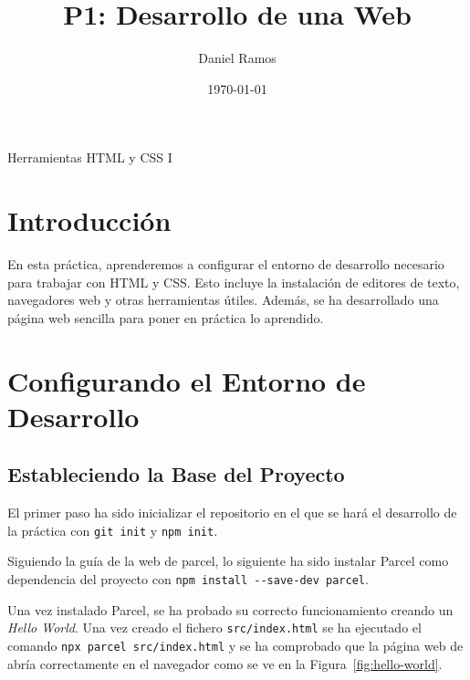 \documentclass{article}
\title{P1: Desarrollo de una Web}
\author{Daniel Ramos}
\date{\today}
\begin{document}
\maketitle

\begin{center}
    \large Herramientas HTML y CSS I
\end{center}

\newpage

\tableofcontents

\newpage

\section*{Introducción}
En esta práctica, aprenderemos a configurar el entorno de desarrollo necesario para trabajar con HTML y CSS. Esto incluye la instalación de editores de texto, navegadores web y otras herramientas útiles. Además, se ha desarrollado una página web sencilla para poner en práctica lo aprendido.

\newpage

\section{Configurando el Entorno de Desarrollo}\label{sec:configurando-el-entorno-de-desarrollo}

\subsection{Estableciendo la Base del Proyecto}\label{subsec:estableciendo-la-base-del-proyecto}

El primer paso ha sido inicializar el repositorio en el que se hará el desarrollo de la práctica con \lstinline|git init| y \lstinline|npm init|.

Siguiendo la guía de la web de parcel, lo siguiente ha sido instalar Parcel como dependencia del proyecto con \lstinline|npm install --save-dev parcel|.

Una vez instalado Parcel, se ha probado su correcto funcionamiento creando un \textit{Hello World}. Una vez creado el fichero \lstinline|src/index.html| se ha ejecutado el comando \lstinline|npx parcel src/index.html| y se ha comprobado que la página web de abría correctamente en el navegador como se ve en la Figura~\ref{fig:hello-world}.
\end{document}
